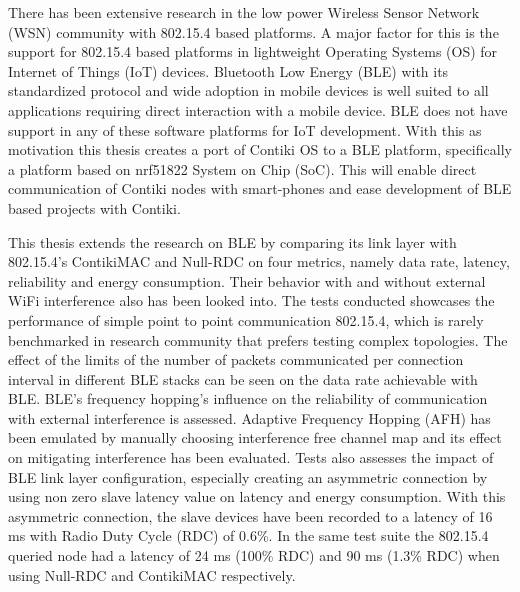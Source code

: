 There has been extensive research in the low power Wireless Sensor Network (WSN) community with 802.15.4 based platforms. A major factor for this is the support for 802.15.4 based platforms in lightweight Operating Systems (OS) for Internet of Things (IoT) devices. Bluetooth Low Energy (BLE) with its standardized protocol and wide adoption in mobile devices is well suited to all applications requiring direct interaction with a mobile device. BLE does not have support in any of these software platforms for IoT development. With this as motivation this thesis creates a port of Contiki OS to a BLE platform, specifically a platform based on nrf51822 System on Chip (SoC). This will enable direct communication of Contiki nodes with smart-phones and ease development of BLE based projects with Contiki.

This thesis extends the research on BLE by comparing its link layer with 802.15.4's ContikiMAC and Null-RDC on four metrics, namely data rate, latency, reliability and energy consumption. Their behavior with and without external WiFi interference also has been looked into. The tests conducted showcases the performance of simple point to point communication 802.15.4, which is rarely benchmarked in research community that prefers testing complex topologies. The effect of the limits of the number of packets communicated per connection interval in different BLE stacks can be seen on the data rate achievable with BLE. BLE's frequency hopping's influence on the reliability of communication with external interference is assessed. Adaptive Frequency Hopping (AFH) has been emulated by manually choosing interference free channel map and its effect on mitigating interference has been evaluated. Tests also assesses the impact of BLE link layer configuration, especially creating an asymmetric connection by using non zero slave latency value on latency and energy consumption. With this asymmetric connection, the slave devices have been recorded to a latency of 16 ms with Radio Duty Cycle (RDC) of 0.6\%. In the same test suite the 802.15.4 queried node had a latency of 24 ms (100\% RDC) and 90 ms (1.3\% RDC) when using Null-RDC and ContikiMAC respectively.




